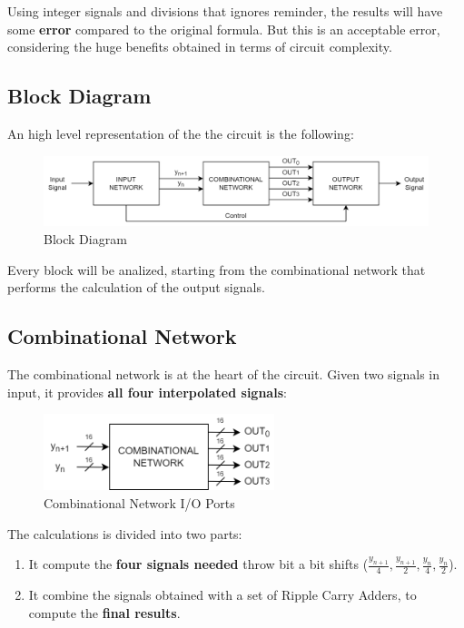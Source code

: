 Using integer signals and divisions that ignores reminder, the results will have some \textbf{error} compared to the original formula. But this is an acceptable error, considering the huge benefits obtained in terms of circuit complexity.

\newpage

\subsection{Block Diagram}

An high level representation of the the circuit is the following:

\begin{figure}[H]
    \centering
    \includegraphics[width=1\textwidth]{img/Chapter2/BlockDiagram.png}
    \caption{Block Diagram}
    \label{fig:BlockDiagram}
\end{figure}

Every block will be analized, starting from the combinational network that performs the calculation of the output signals.

\subsection{Combinational Network}

The combinational network is at the heart of the circuit. Given two signals in input, it provides \textbf{all four interpolated signals}:

\begin{figure}[H]
    \centering
    \includegraphics[width=0.6\textwidth]{img/Chapter2/CombinationalIO.png}
    \caption{Combinational Network I/O Ports}
    \label{fig:CNIO}
\end{figure}

The calculations is divided into two parts:

\begin{enumerate}
    \item It compute the \textbf{four signals needed} throw bit a bit shifts ($\frac{y_{n+1}}{4}, \frac{y_{n+1}}{2}, \frac{y_n}{4}, \frac{y_n}{2}$).
    \item It combine the signals obtained with a set of Ripple Carry Adders, to compute the \textbf{final results}.
\end{enumerate}

